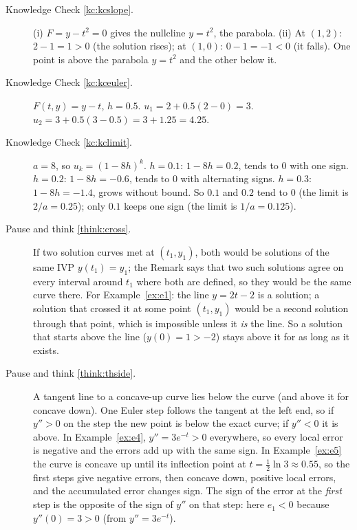 \documentclass[11pt]{article}
\begin{document}
\begin{description}

  \item[Knowledge Check \ref{kc:kcslope}.] (i) $F=y-t^2=0$ gives the nullcline $y=t^2$, the parabola. (ii) At $(1,2)$: $2-1=1>0$ (the solution rises); at $(1,0)$: $0-1=-1<0$ (it falls). One point is above the parabola $y=t^2$ and the other below it.

  \item[Knowledge Check \ref{kc:kceuler}.] $F(t,y)=y-t$, $h=0.5$. $u_1=2+0.5(2-0)=3$. $u_2=3+0.5(3-0.5)=3+1.25=4.25$.

  \item[Knowledge Check \ref{kc:kclimit}.] $a=8$, so $u_k=(1-8h)^k$. $h=0.1$: $1-8h=0.2$, tends to $0$ with one sign. $h=0.2$: $1-8h=-0.6$, tends to $0$ with alternating signs. $h=0.3$: $1-8h=-1.4$, grows without bound. So $0.1$ and $0.2$ tend to $0$ (the limit is $2/a=0.25$); only $0.1$ keeps one sign (the limit is $1/a=0.125$).

  \item[Pause and think \ref{think:cross}.] If two solution curves met at $(t_1,y_1)$, both would be solutions of the same IVP $y(t_1)=y_1$; the Remark says that two such solutions agree on every interval around $t_1$ where both are defined, so they would be the same curve there. For Example~\ref{ex:e1}: the line $y=2t-2$ is a solution; a solution that crossed it at some point $(t_1,y_1)$ would be a second solution through that point, which is impossible unless it \emph{is} the line. So a solution that starts above the line ($y(0)=1>-2$) stays above it for as long as it exists.

  \item[Pause and think \ref{think:thside}.] A tangent line to a concave-up curve lies below the curve (and above it for concave down). One Euler step follows the tangent at the left end, so if $y''>0$ on the step the new point is below the exact curve; if $y''<0$ it is above. In Example~\ref{ex:e4}, $y''=3e^{-t}>0$ everywhere, so every local error is negative and the errors add up with the same sign. In Example~\ref{ex:e5} the curve is concave up until its inflection point at $t=\frac12\ln3\approx0.55$, so the first steps give negative errors, then concave down, positive local errors, and the accumulated error changes sign. The sign of the error at the \emph{first} step is the opposite of the sign of $y''$ on that step: here $e_1<0$ because $y''(0)=3>0$ (from $y''=3e^{-t}$).


\end{description}
\end{document}
